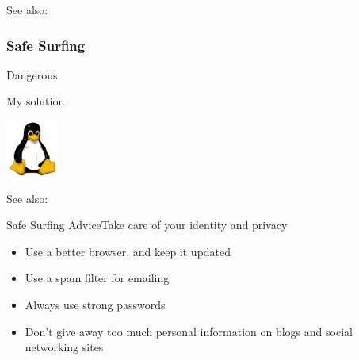 See also: 

\subsubsection{Safe Surfing}

\begin{frame}{Dangerous}
  \begin{center}
  \end{center}\pause
  \begin{block}{My solution}
    \begin{center}
      \includegraphics[height=5em]{linuxlogo}
    \end{center}
  \end{block}
\end{frame}

See also: 
  

\begin{frame}{Safe Surfing Advice}{Take care of your identity and privacy}
  \begin{itemize}
  \item Use a better browser, and keep it updated
  \item Use a spam filter for emailing
  \item Always use strong passwords
  \item Don't give away too much personal information on blogs and social networking sites
  \end{itemize}
\end{frame}

